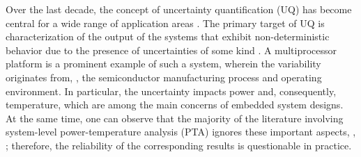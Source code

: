 Over the last decade, the concept of uncertainty quantification (UQ) has become central for a wide range of application areas \cite{xiu2010}. The primary target of UQ is characterization of the output of the systems that exhibit non-deterministic behavior due to the presence of uncertainties of some kind \cite{eldred2009}. A multiprocessor platform is a prominent example of such a system, wherein the variability originates from, \eg, the semiconductor manufacturing process and operating environment. In particular, the uncertainty impacts power and, consequently, temperature, which are among the main concerns of embedded system designs. At the same time, one can observe that the majority of the literature involving system-level power-temperature analysis (PTA) ignores these important aspects, \eg, \cite{rao2009, rai2011, thiele2011, ukhov2012}; therefore, the reliability of the corresponding results is questionable in practice.

